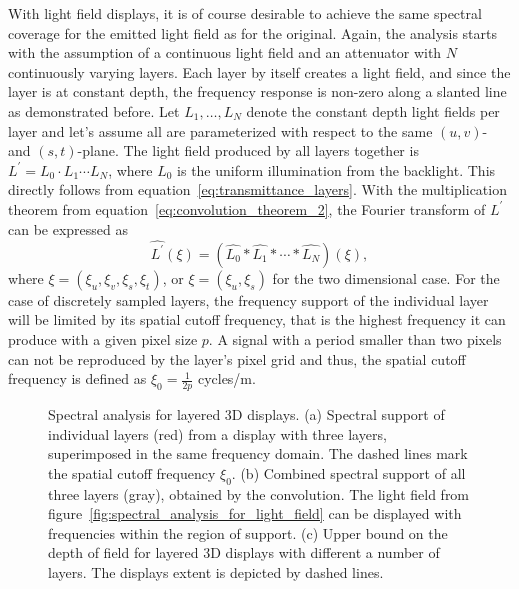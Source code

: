 With light field displays, it is of course desirable to achieve the same spectral coverage for the emitted light field as for the original.
Again, the analysis starts with the assumption of a continuous light field and an attenuator with $N$ continuously varying layers.
Each layer by itself creates a light field, and since the layer is at constant depth, the frequency response is non-zero along a slanted line as demonstrated before.
Let $L_1, \dots , L_N$ denote the constant depth light fields per layer and let's assume all are parameterized with respect to the same $(u, v)$- and \mbox{$(s, t)$-plane}.
The light field produced by all layers together is $L^\prime = L_0 \cdot L_1 \cdots L_N$, where $L_0$ is the uniform illumination from the backlight.
This directly follows from equation~\ref{eq:transmittance_layers}.
With the multiplication theorem from equation~\ref{eq:convolution_theorem_2}, the Fourier transform of $L^\prime$ can be expressed as
\begin{equation}\label{eq:convolution_of_layers}
	\widehat{L^\prime}(\xi) = (\widehat{L_0} \ast \widehat{L_1} \ast \cdots \ast \widehat{L_N}) (\xi), 
\end{equation}
where $\xi = (\xi_u, \xi_v, \xi_s, \xi_t)$, or $\xi = (\xi_u, \xi_s)$ for the two dimensional case.
For the case of discretely sampled layers, the frequency support of the individual layer will be limited by its spatial cutoff frequency, that is the highest frequency it can produce with a given pixel size $p$.
A signal with a period smaller than two pixels can not be reproduced by the layer's pixel grid and thus, the spatial cutoff frequency is defined as $\xi_0 = \frac{1}{2p}$ cycles/m.
\begin{figure}[tb]
	\begin{subfigure}[b]{.3\textwidth}
		\centering
		
		\caption{}
		\label{fig:3_layers}
		
		\caption{}
		\label{fig:3_layes_convolution}
	\end{subfigure}%
	\hfill
	\begin{subfigure}[b]{.7\textwidth}
		\centering
		
		\caption{}
		\label{fig:cut-off-frequency_N_layers}
	\end{subfigure}%
	\caption[Spectral analysis for layered 3D displays]
			{Spectral analysis for layered 3D displays. 
			 (a) Spectral support of individual layers (red) from a display with three layers, superimposed in the same frequency domain.
			 The dashed lines mark the spatial cutoff frequency $\xi_0$.
			 (b) Combined spectral support of all three layers (gray), obtained by the convolution. 
			 The light field from figure~\ref{fig:spectral_analysis_for_light_field} can be displayed with frequencies within the region of support.
			 (c) Upper bound on the depth of field for layered 3D displays with different a number of layers.
			 The displays extent is depicted by dashed lines.}
\end{figure}
